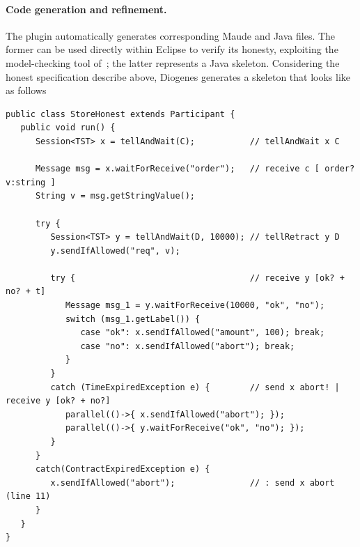 \paragraph{Code generation and refinement.}
The plugin automatically generates corresponding Maude and Java files.
The former can be used directly within Eclipse to verify its honesty,
exploiting the model-checking tool of~\cite{verifiable};
the latter represents a Java skeleton. 
Considering the honest specification describe above,
Diogenes generates a skeleton that looks like as follows
\begin{mdframed}
\begin{verbatim}
public class StoreHonest extends Participant { 
   public void run() {
      Session<TST> x = tellAndWait(C);           // tellAndWait x C
       
      Message msg = x.waitForReceive("order");   // receive c [ order? v:string ]
      String v = msg.getStringValue();
      
      try {
         Session<TST> y = tellAndWait(D, 10000); // tellRetract y D
         y.sendIfAllowed("req", v);
         
         try {                                   // receive y [ok? + no? + t]
            Message msg_1 = y.waitForReceive(10000, "ok", "no");
            switch (msg_1.getLabel()) {                    
               case "ok": x.sendIfAllowed("amount", 100); break;
               case "no": x.sendIfAllowed("abort"); break;                    
            }
         }
         catch (TimeExpiredException e) {        // send x abort! | receive y [ok? + no?] 
            parallel(()->{ x.sendIfAllowed("abort"); });
            parallel(()->{ y.waitForReceive("ok", "no"); });
         }            
      }
      catch(ContractExpiredException e) {
         x.sendIfAllowed("abort");               // : send x abort (line 11)
      } 
   }
}
\end{verbatim}
\end{mdframed}


